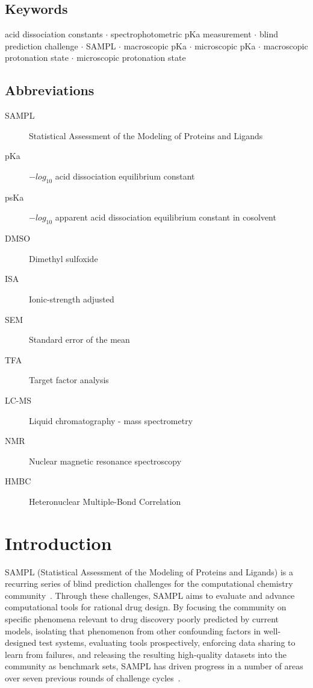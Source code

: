 \documentclass[9pt,lineno]{elife}
\begin{document}
\subsection{Keywords}
acid dissociation constants $\cdot$ spectrophotometric pKa measurement $\cdot$ blind prediction challenge $\cdot$ SAMPL $\cdot$ macroscopic pKa $\cdot$ microscopic pKa  $\cdot$ macroscopic protonation state $\cdot$ microscopic protonation state

\subsection{Abbreviations}
\begin{description}
\item[SAMPL] Statistical Assessment of the Modeling of Proteins and Ligands
\item[pKa] $-log_{10}$ acid dissociation equilibrium constant
\item[psKa] $-log_{10}$ apparent acid dissociation equilibrium constant in cosolvent
\item[DMSO] Dimethyl sulfoxide
\item[ISA] Ionic-strength adjusted
\item[SEM] Standard error of the mean
\item[TFA] Target factor analysis
\item[LC-MS] Liquid chromatography - mass spectrometry
\item[NMR] Nuclear magnetic resonance spectroscopy
\item[HMBC] Heteronuclear Multiple-Bond Correlation
\end{description}

\section{Introduction}

SAMPL (Statistical Assessment of the Modeling of Proteins and Ligands) is a recurring series of blind prediction challenges for the computational chemistry community~\citep{mobley_advancing_2016, sample_D3R_website}. Through these challenges, SAMPL aims to evaluate and advance computational tools for rational drug design. By focusing the community on specific phenomena relevant to drug discovery poorly predicted by current models, isolating that phenomenon from other confounding factors in well-designed test systems, evaluating tools prospectively, enforcing data sharing to learn from failures, and releasing the resulting high-quality datasets into the community as benchmark sets, SAMPL has driven progress in a number of areas over seven previous rounds of challenge cycles~\cite{nicholls_predicting_2008,guthrie_blind_2009,skillman_sampl2_2010,geballe_sampl2_2010,skillman_sampl3_2012,skillman_sampl3_2012,geballe_sampl3_2012,muddana_sampl3_2012,guthrie_sampl4_2014,Mobley:2014:JComputAidedMolDesa,muddana_sampl4_2014,mobley_blind_2014,yin_overview_2016,Bannan:2016:JComputAidedMolDes}.
\end{document}
